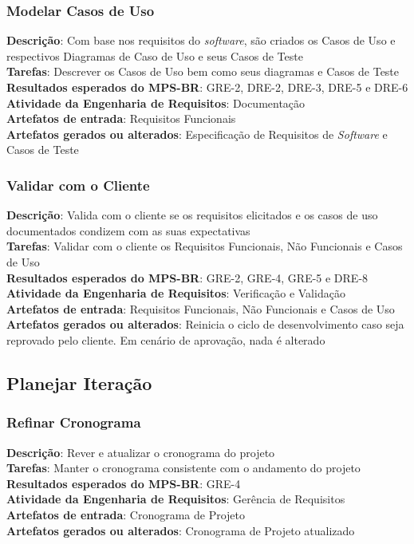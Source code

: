 \subsubsection{Modelar Casos de Uso}

\textbf{Descrição}: Com base nos requisitos do \textit{software}, são criados os Casos de Uso e respectivos Diagramas de Caso de Uso e seus Casos de Teste\\
\textbf{Tarefas}: Descrever os Casos de Uso bem como seus diagramas e Casos de Teste\\
\textbf{Resultados esperados do MPS-BR}: GRE-2, DRE-2, DRE-3, DRE-5 e DRE-6\\
\textbf{Atividade da Engenharia de Requisitos}: Documentação\\
\textbf{Artefatos de entrada}: Requisitos Funcionais\\
\textbf{Artefatos gerados ou alterados}: Especificação de Requisitos de \textit{Software} e Casos de Teste

\subsubsection{Validar com o Cliente}

\textbf{Descrição}: Valida com o cliente se os requisitos elicitados e os casos de uso documentados condizem com as suas expectativas\\
\textbf{Tarefas}: Validar com o cliente os Requisitos Funcionais, Não Funcionais e Casos de Uso\\
\textbf{Resultados esperados do MPS-BR}: GRE-2, GRE-4, GRE-5 e DRE-8\\
\textbf{Atividade da Engenharia de Requisitos}: Verificação e Validação\\
\textbf{Artefatos de entrada}: Requisitos Funcionais, Não Funcionais e Casos de Uso\\
\textbf{Artefatos gerados ou alterados}: Reinicia o ciclo de desenvolvimento caso seja reprovado pelo cliente. Em cenário de aprovação, nada é alterado

\subsection{Planejar Iteração}

\subsubsection{Refinar Cronograma}

\textbf{Descrição}: Rever e atualizar o cronograma do projeto\\
\textbf{Tarefas}: Manter o cronograma consistente com o andamento do projeto\\
\textbf{Resultados esperados do MPS-BR}: GRE-4\\
\textbf{Atividade da Engenharia de Requisitos}: Gerência de Requisitos\\
\textbf{Artefatos de entrada}: Cronograma de Projeto\\
\textbf{Artefatos gerados ou alterados}: Cronograma de Projeto atualizado

